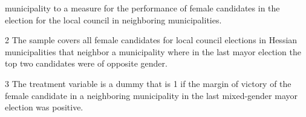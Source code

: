 \begin{table}[H]
\begin{center}
{\begin{threeparttable}
\begin{tablenotes}
\begin{small}
municipality
to
a
measure
for
the
performance
of
female
candidates
in
the
election
for
the
local
council
in
neighboring
municipalities.
\item[2]
The
sample
covers
all
female
candidates
for
local
council
elections
in
Hessian
municipalities
that
neighbor
a
municipality
where
in
the
last
mayor
election
the
top
two
candidates
were
of
opposite
gender.
\item[3]
The
treatment
variable
is
a
dummy
that
is
1
if
the
margin
of
victory
of
the
female
candidate
in
a
neighboring
municipality
in
the
last
mixed-gender
mayor
election
was
positive.
\end{small}
\end{tablenotes} \end{threeparttable} } \end{center} \end{table}

